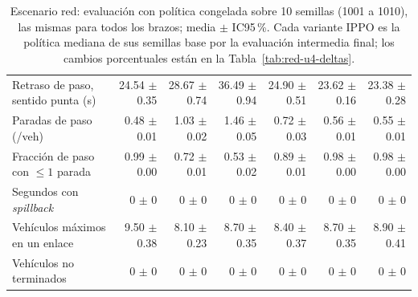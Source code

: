 \begin{table}[H]
\begin{tabular}{p{2.8cm}rrrrrr}
Retraso de paso, sentido punta (s) & 24.54 $\pm$ 0.35 & 28.67 $\pm$ 0.74 & 36.49 $\pm$ 0.94 & 24.90 $\pm$ 0.51 & 23.62 $\pm$ 0.16 & 23.38 $\pm$ 0.28 \\
Paradas de paso (/veh) & 0.48 $\pm$ 0.01 & 1.03 $\pm$ 0.02 & 1.46 $\pm$ 0.05 & 0.72 $\pm$ 0.03 & 0.56 $\pm$ 0.01 & 0.55 $\pm$ 0.01 \\
Fracción de paso con $\le 1$ parada & 0.99 $\pm$ 0.00 & 0.72 $\pm$ 0.01 & 0.53 $\pm$ 0.02 & 0.89 $\pm$ 0.01 & 0.98 $\pm$ 0.00 & 0.98 $\pm$ 0.00 \\
Segundos con \textit{spillback} & 0 $\pm$ 0 & 0 $\pm$ 0 & 0 $\pm$ 0 & 0 $\pm$ 0 & 0 $\pm$ 0 & 0 $\pm$ 0 \\
Vehículos máximos en un enlace & 9.50 $\pm$ 0.38 & 8.10 $\pm$ 0.23 & 8.70 $\pm$ 0.35 & 8.40 $\pm$ 0.37 & 8.70 $\pm$ 0.35 & 8.90 $\pm$ 0.41 \\
Vehículos no terminados & 0 $\pm$ 0 & 0 $\pm$ 0 & 0 $\pm$ 0 & 0 $\pm$ 0 & 0 $\pm$ 0 & 0 $\pm$ 0 \\
\bottomrule
\end{tabular}
\caption[Escenario red: evaluación de las variantes IPPO]{Escenario red: evaluación con política congelada sobre 10 semillas (1001 a 1010), las mismas para todos los brazos; media $\pm$ IC95\,\%. Cada variante IPPO es la política mediana de sus semillas base por la evaluación intermedia final; los cambios porcentuales están en la Tabla~\ref{tab:red-u4-deltas}.}
\label{tab:red-u4}
\end{table}
